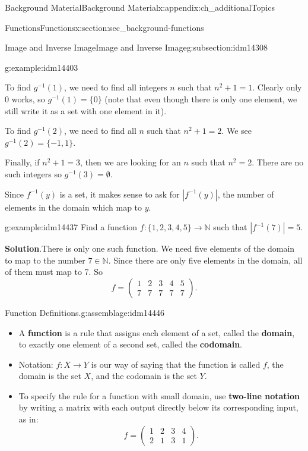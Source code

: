 \documentclass[oneside,10pt,]{book}
\newcommand{\terminology}[1]{\textbf{#1}}
\numberwithin{equation}{chapter}
\def\N{\mathbb N}
\def\inv{^{-1}}
\newcommand{\card}[1]{\left| #1 \right|}
\newcommand{\amp}{&}
\begin{document}
\begin{appendixptx}{Background Material}{}{Background Material}{}{}{x:appendix:ch_additionalTopics}
\begin{sectionptx}{Functions}{}{Functions}{}{}{x:section:sec_background-functions}
\begin{subsectionptx}{Image and Inverse Image}{}{Image and Inverse Image}{}{}{g:subsection:idm14308}
\begin{example}{}{g:example:idm14403}
\par
To find \(g\inv(1)\), we need to find all integers \(n\) such that \(n^2 + 1 = 1\). Clearly only 0 works, so \(g\inv(1) = \{0\}\) (note that even though there is only one element, we still write it as a set with one element in it).%
\par
To find \(g\inv(2)\), we need to find all \(n\) such that \(n^2 + 1 = 2\). We see \(g\inv(2) = \{-1,1\}\).%
\par
Finally, if \(n^2 + 1 = 3\), then we are looking for an \(n\) such that \(n^2 = 2\). There are no such integers so \(g\inv(3) = \emptyset\).%
\end{example}
Since \(f\inv(y)\) is a set, it makes sense to ask for \(\card{f\inv(y)}\), the number of elements in the domain which map to \(y\).%
\begin{example}{}{g:example:idm14437}%
Find a function \(f:\{1,2,3,4,5\} \to \N\) such that \(\card{f\inv(7)} = 5\).%
\par\smallskip%
\noindent\textbf{Solution}.\hypertarget{g:solution:idm14442}{}\quad{}There is only one such function. We need five elements of the domain to map to the number \(7 \in \N\). Since there are only five elements in the domain, all of them must map to 7. So%
\begin{equation*}
f = \begin{pmatrix}1 \amp 2 \amp 3 \amp 4 \amp 5 \\ 7 \amp 7 \amp 7 \amp 7 \amp 7\end{pmatrix}.
\end{equation*}
%
\end{example}
\begin{assemblage}{Function Definitions.}{g:assemblage:idm14446}%
%
\begin{itemize}[label=\textbullet]
\item{}A \terminology{function} is a rule that assigns each element of a set, called the \terminology{domain}, to exactly one element of a second set, called the \terminology{codomain}.%
\item{}Notation: \(f:X \to Y\) is our way of saying that the function is called \(f\), the domain is the set \(X\), and the codomain is the set \(Y\).%
\item{}To specify the rule for a function with small domain, use \terminology{two-line notation} by writing a matrix with each output directly below its corresponding input, as in:%
\begin{equation*}
f = \begin{pmatrix}1 \amp 2 \amp 3 \amp 4 \\ 2 \amp 1 \amp 3 \amp 1 \end{pmatrix}.

\end{equation*}
\end{itemize}
\end{assemblage}
\end{subsectionptx}
\end{sectionptx}
\end{appendixptx}
\end{document}
